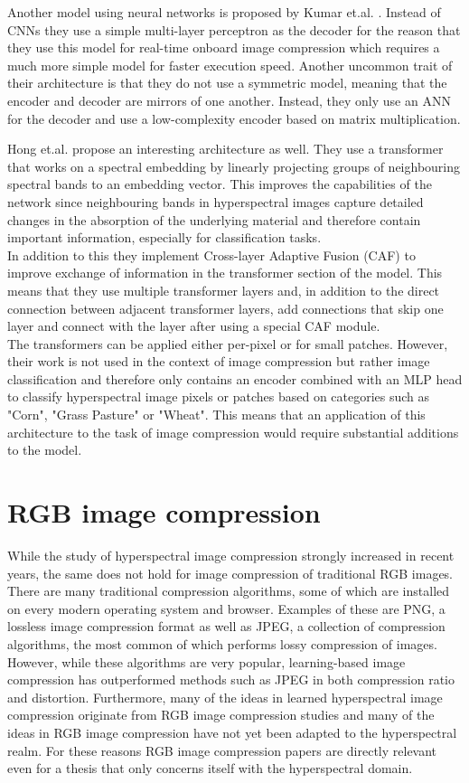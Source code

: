 Another model using neural networks is proposed by Kumar et.al. \citep{leal-taixe_onboard_2019}. Instead of CNNs they use a simple multi-layer perceptron as the decoder for the reason that they use this model for real-time onboard image compression which requires a much more simple model for faster execution speed. Another uncommon trait of their architecture is that they do not use a symmetric model, meaning that the encoder and decoder are mirrors of one another. Instead, they only use an ANN for the decoder and use a low-complexity encoder based on matrix multiplication.

Hong et.al. \citep{hong_spectralformer_2022} propose an interesting architecture as well. They use a transformer that works on a spectral embedding by linearly projecting groups of neighbouring spectral bands to an embedding vector. This improves the capabilities of the network since neighbouring bands in hyperspectral images capture detailed changes in the absorption of the underlying material and therefore contain important information, especially for classification tasks.\\
In addition to this they implement Cross-layer Adaptive Fusion (CAF) to improve exchange of information in the transformer section of the model. This means that they use multiple transformer layers and, in addition to the direct connection between adjacent transformer layers, add connections that skip one layer and connect with the layer after using a special CAF module.\\
The transformers can be applied either per-pixel or for small patches. However, their work is not used in the context of image compression but rather image classification and therefore only contains an encoder combined with an MLP head to classify hyperspectral image pixels or patches based on categories such as "Corn", "Grass Pasture" or "Wheat". This means that an application of this architecture to the task of image compression would require substantial additions to the model. 
\section{RGB image compression \label{sec:ch2rgb}}
While the study of hyperspectral image compression strongly increased in recent years, the same does not hold for image compression of traditional RGB images. There are many traditional compression algorithms, some of which are installed on every modern operating system and browser. Examples of these are PNG, a lossless image compression format as well as JPEG, a collection of compression algorithms, the most common of which performs lossy compression of images. \\
However, while these algorithms are very popular, learning-based image compression has outperformed methods such as JPEG in both compression ratio and distortion. Furthermore, many of the ideas in learned hyperspectral image compression originate from RGB image compression studies and many of the ideas in RGB image compression have not yet been adapted to the hyperspectral realm. For these reasons RGB image compression papers are directly relevant even for a thesis that only concerns itself with the hyperspectral domain.
